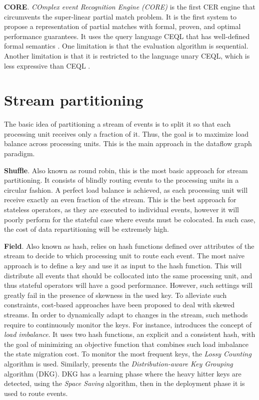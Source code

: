 \textbf{CORE}. \emph{COmplex event Recognition Engine (CORE)} \cite{core} is the first CER engine that circumvents the super-linear partial match problem. It is the first system to propose a representation of partial matches with formal, proven, and optimal performance guarantees. It uses the query language CEQL that has well-defined formal semantics \cite{on-the-expressiveness}. One limitation is that the evaluation algorithm is sequential. Another limitation is that it is restricted to the language unary CEQL, which is less expressive than CEQL \cite{on-the-expressiveness}.

\section{Stream partitioning}\label{sec:stream-partitioning}

The basic idea of partitioning a stream of events is to split it so that each processing unit receives only a fraction of it. Thus, the goal is to maximize load balance across processing units. This is the main approach in the dataflow graph paradigm.

\textbf{Shuffle}. Also known as round robin, this is the most basic approach for stream partitioning. It consists of blindly routing events to the processing units in a circular fashion. A perfect load balance is achieved, as each processing unit will receive exactly an even fraction of the stream. This is the best approach for stateless operators, as they are executed to individual events, however it will poorly perform for the stateful case where events must be colocated. In such case, the cost of data repartitioning will be extremely high.

\textbf{Field}. Also known as hash, relies on hash functions defined over attributes of the stream to decide to which processing unit to route each event. The most naive approach is to define a key and use it as input to the hash function. This will distribute all events that should be collocated into the same processing unit, and thus stateful operators will have a good performance. However, such settings will greatly fail in the presence of skewness in the used key. To alleviate such constraints, cost-based approaches have been proposed to deal with skewed streams. In order to dynamically adapt to changes in the stream, such methods require to continuously monitor the keys. For instance, \cite{DBLP:journals/vldb/Gedik14} introduces the concept of \textit{load imbalance}. It uses two hash functions, an explicit and a consistent hash, with the goal of minimizing an objective function that combines such load imbalance the state migration cost. To monitor the most frequent keys, the \textit{Lossy Counting} algorithm is used. Similarly, \cite{DBLP:conf/debs/RivettiQABS15} presents the \textit{Distribution-aware Key Grouping} algorithm (DKG). DKG has a learning phase where the heavy hitter keys are detected, using the \textit{Space Saving} algorithm, then in the deployment phase it is used to route events.

